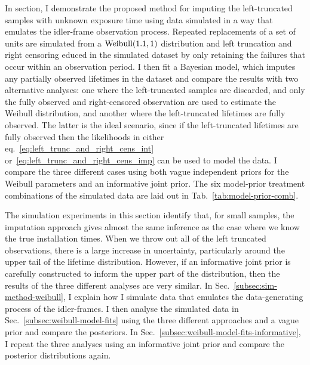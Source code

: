 In section, I demonstrate the proposed method for imputing the left-truncated samples with unknown exposure time using data simulated in a way that emulates the idler-frame observation process. Repeated replacements of a set of units are simulated from a $\hbox{Weibull}(1.1, 1)$ distribution and left truncation and right censoring educed in the simulated dataset by only retaining the failures that occur within an observation period. I then fit a Bayesian model, which imputes any partially observed lifetimes in the dataset and compare the results with two alternative analyses: one where the left-truncated samples are discarded, and only the fully observed and right-censored observation are used to estimate the Weibull distribution, and another where the left-truncated lifetimes are fully observed. The latter is the ideal scenario, since if the left-truncated lifetimes are fully observed then the likelihoods in either eq.~\eqref{eq:left_trunc_and_right_cens_int} or~\eqref{eq:left_trunc_and_right_cens_imp} can be used to model the data. I compare the three different cases using both vague independent priors for the Weibull parameters and an informative joint prior. The six model-prior treatment combinations of the simulated data are laid out in Tab.~\ref{tab:model-prior-comb}. 

The simulation experiments in this section identify that, for small samples, the imputation approach gives almost the same inference as the case where we know the true installation times. When we throw out all of the left truncated observations, there is a large increase in uncertainty, particularly around the upper tail of the lifetime distribution. However, if an informative joint prior is carefully constructed to inform the upper part of the distribution, then the results of the three different analyses are very similar. In Sec.~\ref{subsec:sim-method-weibull}, I explain how I simulate data that emulates the data-generating process of the idler-frames. I then analyse the simulated data in Sec.~\ref{subsec:weibull-model-fits} using the three different approaches and a vague prior and compare the posteriors. In Sec.~\ref{subsec:weibull-model-fits-informative}, I repeat the three analyses using an informative joint prior and compare the posterior distributions again.

